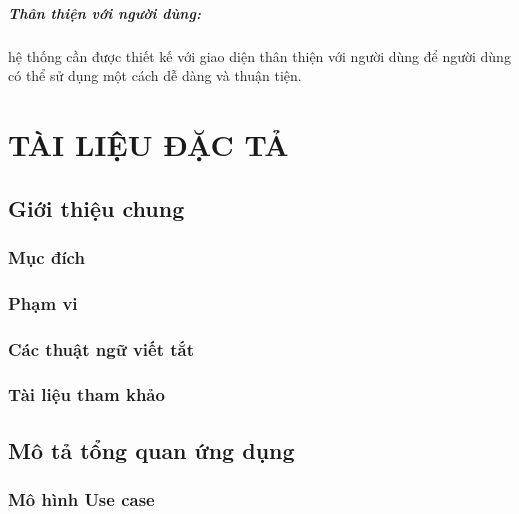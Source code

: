 \documentclass[a4paper,13pt]{report}
\numberwithin{figure}{chapter}
\numberwithin{figure}{section}
\begin{document}
\paragraph{Thân thiện với người dùng:}	hệ thống cần được thiết kế với giao diện thân thiện với người dùng để người dùng có thể sử dụng một cách dễ dàng và thuận tiện.

\chapter*{TÀI LIỆU ĐẶC TẢ}
\setcounter{section}{0}
\section{Giới thiệu chung}
\subsection{Mục đích}
\subsection{Phạm vi}
\subsection{Các thuật ngữ viết tắt}
\subsection{Tài liệu tham khảo}

\section{Mô tả tổng quan ứng dụng}
\subsection{Mô hình Use case}
\end{document}
